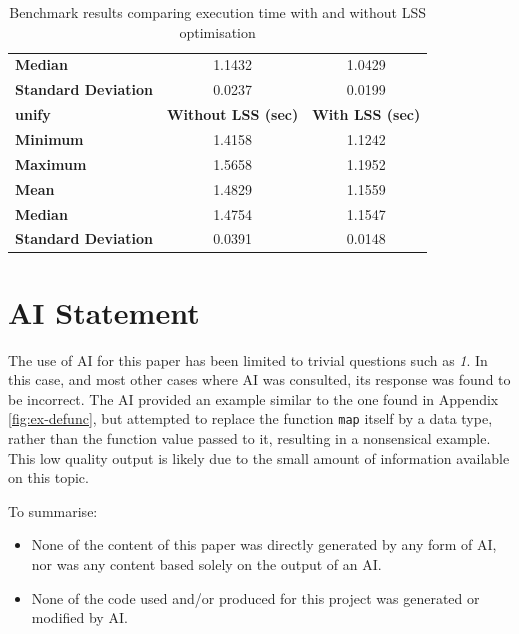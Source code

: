 \documentclass[a4paper,UKenglish,cleveref, autoref, thm-restate]{template/lipics-v2021}
\begin{document}
\begin{appendices}
\begin{table}
\begin{tabular}{l|c c}
      \textbf{Median}             & 1.1432                     & 1.0429                  \\
      \textbf{Standard Deviation} & 0.0237                     & 0.0199                  \\
      \hline
      \textbf{unify}              & \textbf{Without LSS (sec)} & \textbf{With LSS (sec)} \\
      \hline
      \textbf{Minimum}            & 1.4158                     & 1.1242                  \\
      \textbf{Maximum}            & 1.5658                     & 1.1952                  \\
      \textbf{Mean}               & 1.4829                     & 1.1559                  \\
      \textbf{Median}             & 1.4754                     & 1.1547                  \\
      \textbf{Standard Deviation} & 0.0391                     & 0.0148                  \\
    \end{tabular}
    \caption{Benchmark results comparing execution time with and without LSS optimisation}
  \end{table}

  \clearpage

\end{appendices}




\newpage


\section*{AI Statement}
The use of AI for this paper has been limited to trivial questions such as \textit{1}. In this case, and most other cases where AI was consulted, its response was found to be incorrect. The AI provided an example similar to the one found in Appendix \ref{fig:ex-defunc}, but attempted to replace the function \texttt{map} itself by a data type, rather than the function value passed to it, resulting in a nonsensical example. This low quality output is likely due to the small amount of information available on this topic.

\noindent To summarise:
\begin{itemize}
  \item None of the content of this paper was directly generated by any form of AI, nor was any content based solely on the output of an AI.
  \item None of the code used and/or produced for this project was generated or modified by AI.
\end{itemize}
\end{document}
